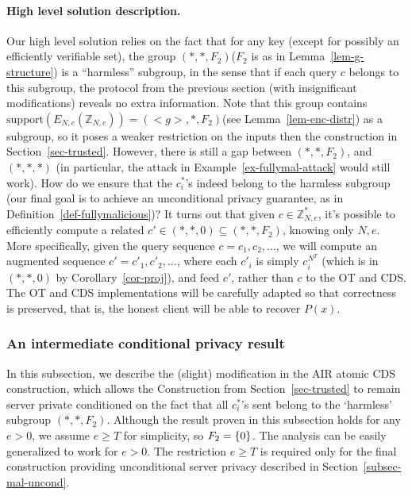 \documentclass[11pt]{article}
\newcommand{\encdj}{{E}_{N,e}}
\newcommand{\Z}{\mathbb{Z}}
\newcommand{\U}[1]{\mathbb{Z}_{#1}^*}
\newcommand\ot{\mbox{OT}\xspace}
\newcommand{\mathify}[1]{\ifmmode{#1}\else\mbox{$#1$}\fi}
\newcommand{\set}[2][]{\mathify{{\left\{#2\right\}}^{#1}}}
\newcommand{\support}{{\mathrm{support}}}
\begin{document}
\paragraph{High level solution description.} Our high level solution
relies on the fact that for any key (except for possibly an
efficiently verifiable set), the group $(*,*,F_2)$($F_2$ is as in
Lemma~\ref{lem-g-structure}) is a ``harmless'' subgroup, in the
sense that if each query $c$ belongs to this subgroup, the protocol
from the previous section (with insignificant modifications)
reveals no extra information. Note that this group contains
$\support(\encdj(\Z_{N,e}))=(<g>,*,F_2)$(see
Lemma~\ref{lem-enc-distr}) as a subgroup, so it poses a weaker
restriction on the inputs then the construction in
Section~\ref{sec-trusted}. However, there is still a gap between
$(*,*,F_2)$, and $(*,*,*)$ (in particular, the attack in
Example~\ref{ex-fullymal-attack} would still work).
How do we ensure that the $c^*_i$'s indeed belong to the harmless
subgroup (our final goal is to achieve an unconditional privacy
guarantee, as in Definition~\ref{def-fullymalicious})? It turns out
that given $c\in \U{N,e}$, it's possible to efficiently compute a
related $c'\in (*,*,0)\subseteq(*,*,F_2)$, knowing only $N,e$. More
specifically, given the query sequence $c=c_1,c_2,\ldots$, we will
compute an augmented sequence $c'=c'_1,c'_2,\ldots$, where each
$c'_i$ is simply $c^{N^T}_i$ (which is in $(*,*,0)$ by
Corollary~\ref{cor-proj}), and feed $c'$, rather than $c$ to the \ot
and CDS. The \ot and CDS implementations will be carefully adapted so
that correctness is preserved, that is, the honest client will be
able to recover $P(x)$.
\subsubsection{An intermediate conditional privacy result}
\label{subsec-mal-cond}
In this subsection, we describe the (slight) modification in the AIR atomic CDS construction, which allows the
Construction from Section~\ref{sec-trusted} to remain server private conditioned on the fact that all $c^*_i$'s sent belong to the `harmless' subgroup $(*,*,F_2)$. Although the result proven in this subsection holds for
any $e>0$, we assume $e\geq T$ for simplicity, so $F_2=\set{0}$. The analysis can be easily generalized
to work for $e>0$. The restriction $e\geq T$ is required only for the final construction providing unconditional server privacy described in Section~\ref{subsec-mal-uncond}.
\end{document}
